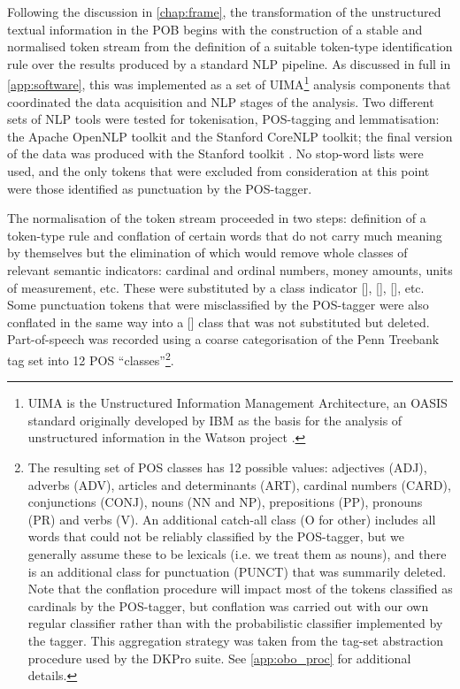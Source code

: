 Following the discussion in \autoref{chap:frame}, the transformation of the unstructured textual information in the POB begins with the construction of a stable and normalised token stream from the definition of a suitable token-type identification rule over the results produced by a standard NLP pipeline.
As discussed in full in \autoref{app:software}, this was implemented as a set of UIMA\footnote{
    UIMA is the Unstructured Information Management Architecture, an OASIS standard originally developed by IBM as the basis for the analysis of unstructured information in the Watson project \citep{ferrucci2004}.
} analysis components that coordinated the data acquisition and NLP stages of the analysis.
Two different sets of NLP tools were tested for tokenisation, POS-tagging and lemmatisation: the Apache OpenNLP toolkit and the Stanford CoreNLP toolkit; the final version of the data was produced with the Stanford toolkit \citep{manning2014}.
No stop-word lists were used, and the only tokens that were excluded from consideration at this point were those identified as punctuation by the POS-tagger.

The normalisation of the token stream proceeded in two steps: definition of a token-type rule and conflation of certain words that do not carry much meaning by themselves but the elimination of which would remove whole classes of relevant semantic indicators: cardinal and ordinal numbers, money amounts, units of measurement, etc.
These were substituted by a class indicator [], [], [], etc.
Some punctuation tokens that were misclassified by the POS-tagger were also conflated in the same way into a [] class that was not substituted but deleted.
Part-of-speech was recorded using a coarse categorisation of the Penn Treebank tag set
into 12 POS ``classes''\footnote{
    \label{foot:posc}
    The resulting set of POS classes has 12 possible values: adjectives (ADJ), adverbs (ADV), articles and determinants (ART), cardinal numbers (CARD), conjunctions (CONJ), nouns (NN and NP), prepositions (PP), pronouns (PR) and verbs (V). An additional catch-all class (O for other) includes all words that could not be reliably classified by the POS-tagger, but we generally assume these to be lexicals (i.e. we treat them as nouns), and there is an additional class for punctuation (PUNCT) that was summarily deleted.
    Note that the conflation procedure will impact most of the tokens classified as cardinals by the POS-tagger, but conflation was carried out with our own regular classifier rather than with the probabilistic classifier implemented by the tagger.
    This aggregation strategy was taken from the tag-set abstraction procedure used by the DKPro suite. %
    See \autoref{app:obo_proc} for additional details.
}.

